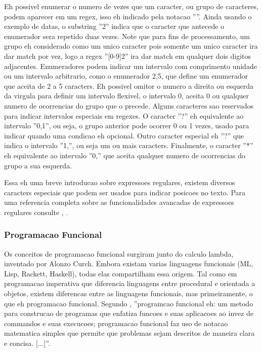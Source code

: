 Eh possivel enumerar o numero de vezes que um caracter, ou grupo de caracteres, podem aparecer em um regex, isso eh indicado pela notacao ''{}''.
Ainda usando o exemplo de datas, o substring ''{2}'' indica que o caracter que antecede o enumerador sera repetido duas vezes.
Note que para fins de processamento, um grupo eh considerado como um unico caracter pois somente um unico caracter ira dar match por vez, logo a regex ''[0-9]{2}'' ira dar match em qualquer dois digitos adjacentes.
Enumeradores podem indicar um intervalo com comprimento unidade ou um intervalo arbitrario, como o enumerador {2,5}, que define um enumerador que aceita de 2 a 5 caracters.
Eh possivel omitor o numero a direita ou esquerda da virgula para definir um intervalo flexivel, o intervalo {0,} aceita 0 ou qualquer numero de ocorrencias do grupo que o precede.
Alguns caracteres sao reservados para indicar intervalos especiais em regexes.
O caracter ''?'' eh equivalente ao intervalo ''{0,1}'', ou seja, o grupo anterior pode ocorrer 0 ou 1 vezes, usado para indicar quando uma condicao eh opcional.
Outro caracter especial eh ''?'' que indica o intervalo ''{1,}'', ou seja um ou mais caracters.
Finalmente, o caracter ''*'' eh equivalente ao intervalo ''{0,}'' que aceita qualquer numero de ocorrencias do grupo a sua esquerda.

Essa eh uma breve introducao sobre expressoes regulares, existem diversos caracters especiais que podem ser usados para indicar posicoes no texto.
Para uma referencia completa sobre as funcionalidades avancadas de expressoes regulares consulte \cite{python-re}, \cite{jeffrey}.


\subsubsection{Programacao Funcional}

Os conceitos de programacao funcional surgiram junto do calculo lambda, inventado por Alonzo Curch.
Embora existam varias linguagens funcionais (ML, Lisp, Rackett, Haskell), todas elas compartilham essa origem.
Tal como em programacao imperativa que diferencia linguagens entre procedural e orientada a objetos, existem diferencas entre as linguagens funcionais, mas primeiramente, o que eh programacao funcional.
Segundo \cite{Bird}, ''programcao funcional eh: um metodo para construcao de programas que enfatiza funcoes e suas aplicacoes ao invez de commandos e suas execucoes; programacao funcional faz uso de notacao matematica simples que permite que problemas sejam descritos de maneira clara e concisa. [...]''.

